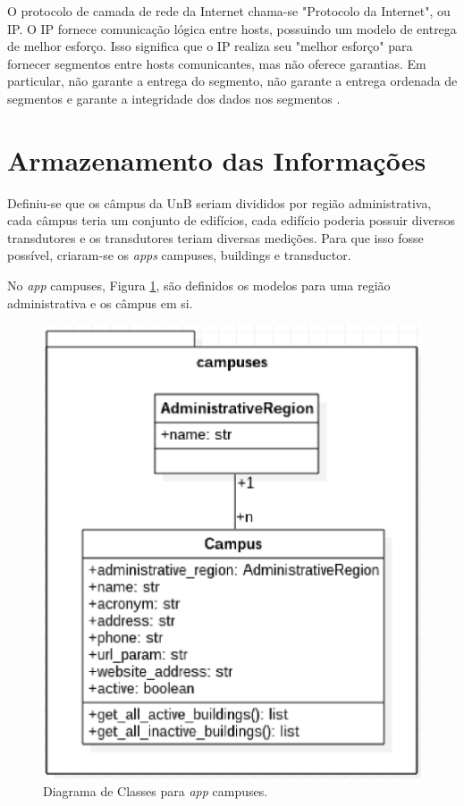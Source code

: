     O protocolo de camada de rede da Internet chama-se "Protocolo da Internet", ou IP. O IP fornece comunicação lógica entre hosts, possuindo um modelo de entrega de melhor esforço. Isso significa que o IP realiza seu "melhor esforço" para fornecer segmentos entre hosts comunicantes, mas não oferece garantias. Em particular, não garante a entrega do segmento, não garante a entrega ordenada de segmentos e garante a integridade dos dados nos segmentos \cite{kurose_2002}.

\section{Armazenamento das Informações}
Definiu-se que os câmpus da UnB seriam divididos por região administrativa, cada câmpus teria um conjunto de edifícios, cada edifício poderia possuir diversos transdutores e os transdutores teriam diversas medições. Para que isso fosse possível, criaram-se os \textit{apps} campuses, buildings e transductor.

No \textit{app} campuses, Figura \ref{campuses}, são definidos os modelos para uma região administrativa e os câmpus em si.

\begin{figure}[!h]
    \centering
    \includegraphics[keepaspectratio=true,scale=0.8]{figuras/campuses.eps}
    \caption{Diagrama de Classes para \textit{app} campuses.}
    \label{campuses}
\end{figure}

